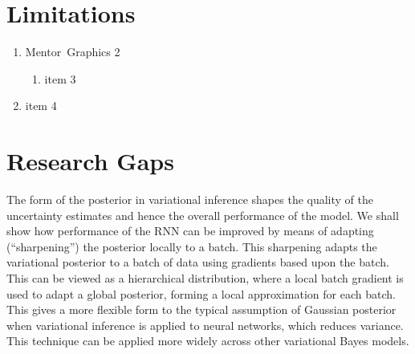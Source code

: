 \section{Limitations}
\begin{enumerate}
\item Mentor~Graphics 2
\begin{enumerate}
\item item 3
\end{enumerate}
\item item 4
\end{enumerate}

\section{Research Gaps}
The form of the posterior in variational inference shapes the quality of the uncertainty estimates and hence the overall performance of the model.
We shall show how performance of the RNN can be improved by means of adapting (``sharpening'') the posterior locally to a batch.
This sharpening adapts the variational posterior to a batch of data using gradients based upon the batch.
This can be viewed as a hierarchical distribution, where a local batch gradient is used to adapt a global posterior, forming a local approximation for each batch.
This gives a more flexible form  to the typical assumption of Gaussian posterior when variational inference is applied to neural networks, which reduces variance. This technique can be applied more widely across other variational Bayes models.
